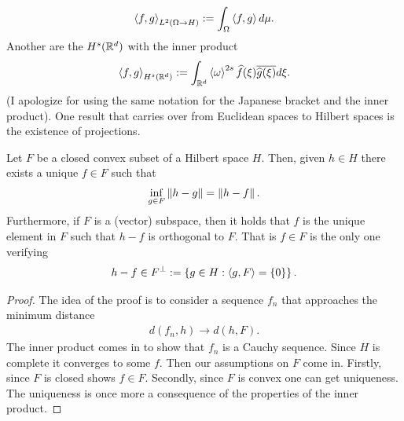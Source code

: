 \documentclass[
    a4paper,
    DIV=14,
    abstract=true,
    numbers=noenddot
]{scrartcl}
\begin{document}
	\begin{align*}
		\left\langle f,g\right\rangle_{L^2(\Omega \to H)}:= \int_{\Omega} \left\langle f,g\right\rangle d\mu .
	\end{align*}
	Another are the  $H^s(\mathbb{R}^d)$ with the inner product
	\begin{align*}
		\left\langle f,g\right\rangle_{H^s(\mathbb{R}^d)}:= \int_{\mathbb{R}^d} \left\langle\omega\right\rangle^{2s} \widehat{f}(\xi ) \overline{\widehat{g}(\xi )}d\xi  .
	\end{align*}
	(I apologize for using the same notation for the Japanese bracket and the inner product). One result that carries over from Euclidean spaces to Hilbert spaces is the existence of projections.
	\begin{theorem}\label{projection}
		Let $F$ be a closed convex subset of a Hilbert space $H$. Then, given  $h \in H$ there exists a unique $ f \in F$ such that
		\begin{align*}
			\inf_{g \in F}\left\lVert h-g \right\rVert= \left\lVert h-f \right\rVert.
		\end{align*}
		Furthermore, if $F$ is a (vector) subspace, then it holds that $f$ is the unique element in  $F$ such that $h-f$ is orthogonal to  $F$. That is $f\in F$ is the only one verifying
		\begin{align*}
			h-f \in F^\perp:= \left\{g \in H : \left\langle g,F\right\rangle=\{0\}\right\}.
		\end{align*}
	\end{theorem}
	\begin{proof}
		The idea of the proof is to consider a sequence $f_n$ that approaches the minimum distance
		\begin{align*}
			d(f_n,h)\to d(h,F).
		\end{align*}
		The inner product comes in to show that  $f_n$ is a Cauchy sequence. Since $H$ is complete it converges to some  $f$. Then our assumptions on $F$ come in. Firstly, since $F$ is closed shows $f \in F$. Secondly, since $F$ is convex one can get uniqueness. The uniqueness is once more a consequence of the properties of the inner product.
	\end{proof}
\end{document}
